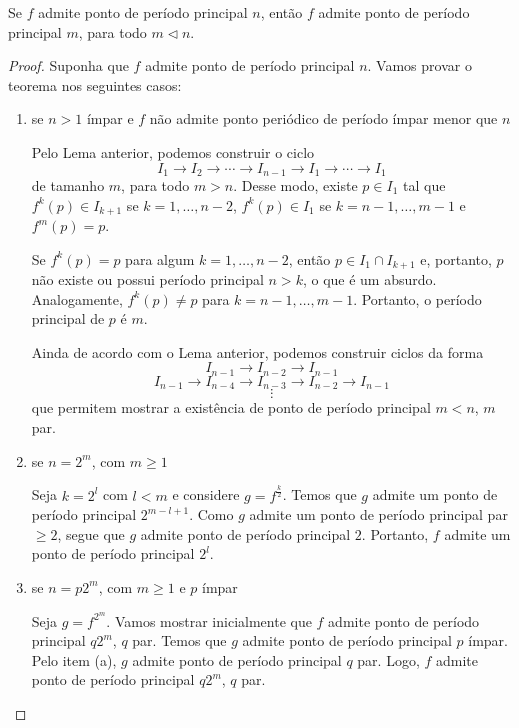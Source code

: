 \begin{theorem}[Sharkovsky]
Se $f$ admite ponto de período principal $n$, então $f$ admite ponto de período principal $m$, para todo $m \triangleleft n$.
\end{theorem}

\begin{proof}
Suponha que $f$ admite ponto de período principal $n$. Vamos provar o teorema nos seguintes casos:
\begin{enumerate}[label = (\alph*)]
\item se $n > 1$ ímpar e $f$ não admite ponto periódico de período ímpar menor que $n$

Pelo Lema anterior,  podemos construir o ciclo $$I_1 \longrightarrow I_2 \longrightarrow \cdots \longrightarrow I_{n-1} \longrightarrow I_1 \longrightarrow \cdots \longrightarrow I_1$$ de tamanho $m$, para todo $m > n$. Desse modo, existe $p \in I_1$ tal que $f^k(p) \in I_{k+1}$ se $k = 1, \dots, n-2$, $f^k(p) \in I_1$ se $k = n-1, \dots, m-1$ e $f^m(p) = p$.

Se $f^k(p) = p$ para algum $k = 1, \dots, n-2$, então $p \in I_1 \cap I_{k+1}$ e, portanto, $p$ não existe ou possui período principal $n > k$, o que é um absurdo. Analogamente, $f^k(p) \neq p$ para $k = n-1, \dots, m-1$. Portanto, o período principal de $p$ é $m$.

Ainda de acordo com o Lema anterior, podemos construir ciclos da forma
$$I_{n-1} \longrightarrow I_{n-2} \longrightarrow I_{n-1}$$
$$I_{n-1} \longrightarrow I_{n-4} \longrightarrow I_{n-3} \longrightarrow I_{n-2} \longrightarrow I_{n-1}$$
$$\vdots$$
que permitem mostrar a existência de ponto de período principal $m < n$, $m$ par.
\item se $n = 2^m$, com $m \geq 1$

Seja $k = 2^l$ com $l < m$ e considere $g = f^\frac{k}{2}$. Temos que $g$ admite um ponto de período principal $2^{m-l+1}$. Como $g$ admite um ponto de período principal par $\geq 2$, segue que $g$ admite ponto de período principal $2$. Portanto, $f$ admite um ponto de período principal $2^l$.

\item se $n = p 2^m$, com $m \geq 1$ e $p$ ímpar

Seja $g = f^{2^m}$. Vamos mostrar inicialmente que $f$ admite ponto de período principal $q2^m$, $q$ par. Temos que $g$ admite ponto de período principal $p$ ímpar. Pelo item (a), $g$ admite ponto de período principal $q$ par. Logo, $f$ admite ponto de período principal $q2^m$, $q$ par.


\end{enumerate}
\end{proof}
